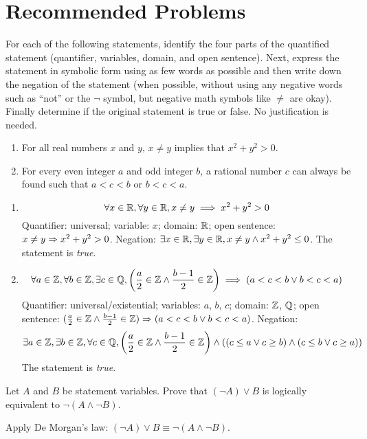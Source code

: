 \section{Recommended Problems}
\begin{recommended}
  For each of the following statements, identify the four parts of the quantified statement (quantifier, variables, domain, and open sentence).
  Next, express the statement in symbolic form using as few words as possible and then write down the negation of the statement
  (when possible, without using any negative words such as “not” or the $\lnot$ symbol, but negative math symbols like $\neq$ are okay).
  Finally determine if the original statement is true or false. No justification is needed.
  \begin{enumerate}
    \item For all real numbers $x$ and $y$, $x \neq y$ implies that $x^2+y^2 > 0$.
    \item For every even integer $a$ and odd integer $b$, a rational number $c$ can always be found such that $a<c<b$ or $b<c<a$.
  \end{enumerate}
\end{recommended}
\begin{sol}
  \begin{enumerate}
    \item \[ \forall x\in\mathbb{R}, \forall y\in\mathbb{R}, x \neq y \implies x^2+y^2>0 \]
          Quantifier: universal;
          variable: $x$;
          domain: $\mathbb{R}$;
          open sentence: $x \neq y \Rightarrow x^2+y^2>0$.
          Negation: $\exists x\in\mathbb{R}, \exists y\in\mathbb{R}, x \neq y \land x^2+y^2\leq0$.
          The statement is \emph{true}.
    \item \[
            \forall a\in\mathbb{Z}, \forall b\in\mathbb{Z}, \exists c\in\mathbb{Q},
            \left(\frac{a}{2}\in\mathbb{Z} \land \frac{b-1}{2}\in\mathbb{Z}\right) \implies (a<c<b \lor b<c<a)
          \]
          Quantifier: universal/existential;
          variables: $a$, $b$, $c$;
          domain: $\mathbb{Z}$, $\mathbb{Q}$;
          open sentence: $(\frac{a}{2}\in\mathbb{Z} \land \frac{b-1}{2}\in\mathbb{Z}) \Rightarrow (a<c<b \lor b<c<a)$.
          Negation:
          \[
            \exists a\in\mathbb{Z}, \exists b\in\mathbb{Z}, \forall c\in\mathbb{Q},
            \qty(\frac{a}{2}\in\mathbb{Z} \land \frac{b-1}{2}\in\mathbb{Z}) \land
            \qty((c \leq a \lor c \geq b) \land (c \leq b \lor c \geq a))
          \]
          The statement is \emph{true}.
          \qedhere
  \end{enumerate}
\end{sol}

\begin{recommended}
  Let $A$ and $B$ be statement variables.
  Prove that $(\lnot A) \lor B$ is logically equivalent to $\lnot(A \land \lnot B)$.
\end{recommended}
\begin{prf}
  Apply De Morgan's law: $(\lnot A) \lor B \equiv \lnot(A \land \lnot B)$.
\end{prf}


